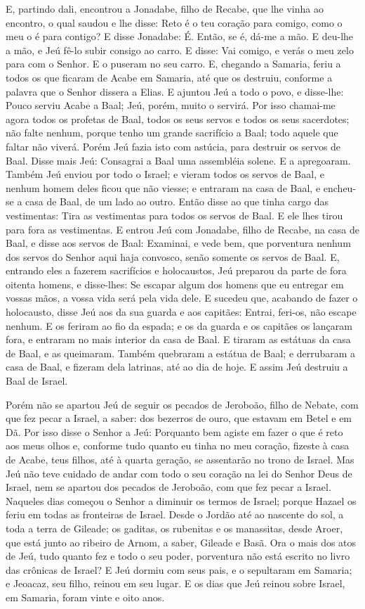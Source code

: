 E, partindo dali, encontrou a Jonadabe, filho de Recabe, que lhe
vinha ao encontro, o qual saudou e lhe disse: Reto é o teu coração
para comigo, como o meu o é para contigo? E disse Jonadabe: É.
Então, se é, dá-me a mão. E deu-lhe a mão, e Jeú fê-lo subir consigo
ao carro. E disse: Vai comigo, e verás o meu zelo para com o
Senhor. E o puseram no seu carro. E, chegando a Samaria,
feriu a todos os que ficaram de Acabe em Samaria, até que os
destruiu, conforme a palavra que o Senhor dissera a Elias. E
ajuntou Jeú a todo o povo, e disse-lhe: Pouco serviu Acabe a Baal;
Jeú, porém, muito o servirá. Por isso chamai-me agora todos
os profetas de Baal, todos os seus servos e todos os seus
sacerdotes; não falte nenhum, porque tenho um grande sacrifício a
Baal; todo aquele que faltar não viverá. Porém Jeú fazia isto com
astúcia, para destruir os servos de Baal. Disse mais Jeú:
Consagrai a Baal uma assembléia solene. E a apregoaram.
Também Jeú enviou por todo o Israel; e vieram todos os servos
de Baal, e nenhum homem deles ficou que não viesse; e entraram na
casa de Baal, e encheu-se a casa de Baal, de um lado ao outro.
Então disse ao que tinha cargo das vestimentas: Tira as
vestimentas para todos os servos de Baal. E ele lhes tirou para fora
as vestimentas. E entrou Jeú com Jonadabe, filho de Recabe,
na casa de Baal, e disse aos servos de Baal: Examinai, e vede bem,
que porventura nenhum dos servos do Senhor aqui haja convosco, senão
somente os servos de Baal. E, entrando eles a fazerem
sacrifícios e holocaustos, Jeú preparou da parte de fora oitenta
homens, e disse-lhes: Se escapar algum dos homens que eu entregar em
vossas mãos, a vossa vida será pela vida dele. E sucedeu que,
acabando de fazer o holocausto, disse Jeú aos da sua guarda e aos
capitães: Entrai, feri-os, não escape nenhum. E os feriram ao fio da
espada; e os da guarda e os capitães os lançaram fora, e entraram no
mais interior da casa de Baal. E tiraram as estátuas da casa
de Baal, e as queimaram. Também quebraram a estátua de Baal;
e derrubaram a casa de Baal, e fizeram dela latrinas, até ao dia de
hoje. E assim Jeú destruiu a Baal de Israel.

Porém não se apartou Jeú de seguir os pecados de Jeroboão, filho
de Nebate, com que fez pecar a Israel, a saber: dos bezerros de
ouro, que estavam em Betel e em Dã. Por isso disse o Senhor a
Jeú: Porquanto bem agiste em fazer o que é reto aos meus olhos e,
conforme tudo quanto eu tinha no meu coração, fizeste à casa de
Acabe, teus filhos, até à quarta geração, se assentarão no trono de
Israel. Mas Jeú não teve cuidado de andar com todo o seu
coração na lei do Senhor Deus de Israel, nem se apartou dos pecados
de Jeroboão, com que fez pecar a Israel. Naqueles dias
começou o Senhor a diminuir os termos de Israel; porque Hazael os
feriu em todas as fronteiras de Israel. Desde o Jordão até ao
nascente do sol, a toda a terra de Gileade; os gaditas, os rubenitas
e os manassitas, desde Aroer, que está junto ao ribeiro de Arnom, a
saber, Gileade e Basã. Ora o mais dos atos de Jeú, tudo
quanto fez e todo o seu poder, porventura não está escrito no livro
das crônicas de Israel? E Jeú dormiu com seus pais, e o
sepultaram em Samaria; e Jeoacaz, seu filho, reinou em seu lugar.
E os dias que Jeú reinou sobre Israel, em Samaria, foram
vinte e oito anos.

